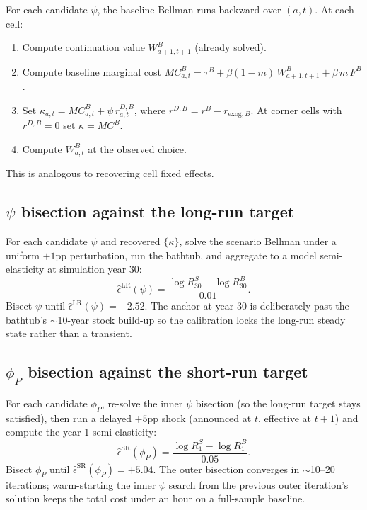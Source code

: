 \documentclass[11pt]{article}
\newcommand{\rB}{r^{B}}
\begin{document}
For each candidate $\psi$, the baseline Bellman runs backward over $(a, t)$.
At each cell:
\begin{enumerate}
  \item Compute continuation value $W^B_{a+1, t+1}$ (already solved).
  \item Compute baseline marginal cost
        $MC^B_{a,t} = \tau^B + \beta(1-m)\,W^B_{a+1,t+1} + \beta\,m\,F^B$.
  \item Set $\kappa_{a,t} = MC^B_{a,t} + \psi\,r^{D,B}_{a,t}$, where
        $r^{D,B} = \rB - r_{\text{exog},B}$. At corner cells with
        $r^{D,B} = 0$ set $\kappa = MC^B$.
  \item Compute $W^B_{a, t}$ at the observed choice.
\end{enumerate}
This is analogous to recovering cell fixed effects.

\subsection{$\psi$ bisection against the long-run target}

For each candidate $\psi$ and recovered $\{\kappa\}$, solve the scenario
Bellman under a uniform $+1$pp perturbation, run the bathtub, and aggregate
to a model semi-elasticity at simulation year $30$:
\begin{equation}
\widehat{\epsilon}^{\text{LR}}(\psi) = \frac{\log R^S_{30} - \log R^B_{30}}{0.01}.
\end{equation}
Bisect $\psi$ until $\widehat{\epsilon}^{\text{LR}}(\psi) = -2.52$. The
anchor at year 30 is deliberately past the bathtub's $\sim$10-year stock
build-up so the calibration locks the long-run steady state rather than a
transient.

\subsection{$\phi_P$ bisection against the short-run target}

For each candidate $\phi_P$, re-solve the inner $\psi$ bisection (so the
long-run target stays satisfied), then run a delayed $+5$pp shock
(announced at $t$, effective at $t+1$) and compute the year-1
semi-elasticity:
\begin{equation}
\widehat{\epsilon}^{\text{SR}}(\phi_P) = \frac{\log R^S_{1} - \log R^B_{1}}{0.05}.
\end{equation}
Bisect $\phi_P$ until $\widehat{\epsilon}^{\text{SR}}(\phi_P) = +5.04$. The
outer bisection converges in $\sim$10--20 iterations; warm-starting the
inner $\psi$ search from the previous outer iteration's solution keeps the
total cost under an hour on a full-sample baseline.
\end{document}
